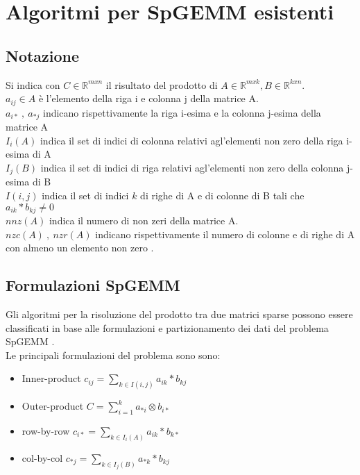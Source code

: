\chapter{Algoritmi per SpGEMM esistenti}
\label{Chapter1} %

\newcommand{\nnz}{non zero }
\newcommand{\keyword}[1]{\textbf{#1}}
\newcommand{\tabhead}[1]{\textbf{#1}}
\newcommand{\code}[1]{\texttt{#1}}
\newcommand{\file}[1]{\texttt{\bfseries#1}}
\newcommand{\option}[1]{\texttt{\itshape#1}}


\section{Notazione}
Si indica con $C \in \mathbb{R}^{m x n}$ il risultato del prodotto di 
$A \in \mathbb{R}^{m x k},B \in \mathbb{R}^{k x n}$. \\ 
$a_{ij} \in A$ è l'elemento della riga i e colonna j della matrice A.\\
$a_{i*}~,~a_{*j}$ indicano rispettivamente la riga i-esima e la colonna j-esima della matrice A\\
$I_i(A)$ indica il set di indici di colonna relativi agl'elementi non zero della riga i-esima di A\\
$I_j(B)$ indica il set di indici di riga relativi agl'elementi non zero della colonna j-esima di B\\
$I(i,j)$ indica il set di indici $k$ di righe di A e di colonne di B tali che
$a_{ik}*b_{kj} \neq 0$\\
$nnz(A)$ indica il numero di non zeri della matrice A. \\ 
$nzc(A)~,~nzr(A)$ indicano rispettivamente il numero di colonne e di righe di A 
con almeno un elemento \nnz.\\

\section{Formulazioni SpGEMM}
Gli algoritmi per la risoluzione del prodotto tra due matrici sparse possono
essere classificati in base alle formulazioni e partizionamento dei dati del problema SpGEMM 
\parencite{sysReviewChi}.\\ Le principali formulazioni del problema sono sono:
\begin{itemize}
  \item Inner-product \qquad $c_{ij} = \sum\limits_{k \in I(i,j)}  a_{ik} \ast  b_{kj}$
  \item Outer-product \qquad $C = \sum\limits_{i=1}^k  a_{*i} \otimes  b_{i*}$		
  \item row-by-row	  \qquad $c_{i*} = \sum\limits_{k \in I_i(A)}  a_{ik} \ast  b_{k*}$
  \item col-by-col    \qquad $c_{*j} = \sum\limits_{k \in I_j(B)}  a_{*k} \ast  b_{kj}$
\end{itemize}

